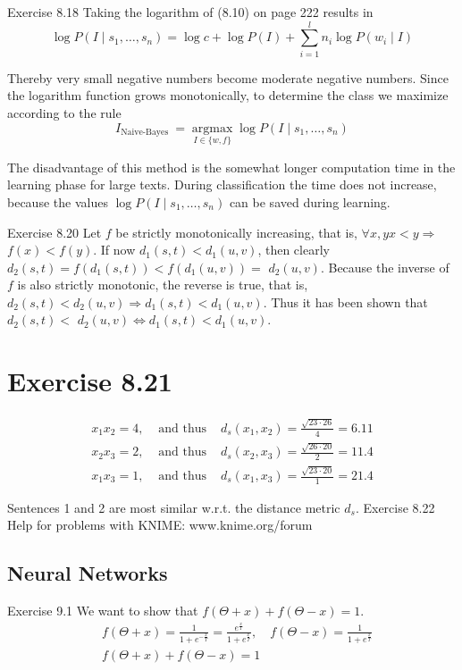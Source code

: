 \documentclass[10pt]{book}
\begin{document}
Exercise 8.18 Taking the logarithm of (8.10) on page 222 results in
$$
\log P\left(I \mid s_{1}, \ldots, s_{n}\right)=\log c+\log P(I)+\sum_{i=1}^{l} n_{i} \log P\left(w_{i} \mid I\right)
$$

Thereby very small negative numbers become moderate negative numbers. Since the logarithm function grows monotonically, to determine the class we maximize according to the rule
$$
I_{\text {Naive-Bayes }}=\underset{I \in\{w, f\}}{\operatorname{argmax}} \log P\left(I \mid s_{1}, \ldots, s_{n}\right)
$$

The disadvantage of this method is the somewhat longer computation time in the learning phase for large texts. During classification the time does not increase, because the values $\log P\left(I \mid s_{1}, \ldots, s_{n}\right)$ can be saved during learning.

Exercise 8.20 Let $f$ be strictly monotonically increasing, that is, $\forall x, y x<y \Rightarrow$ $f(x)<f(y)$. If now $d_{1}(s, t)<d_{1}(u, v)$, then clearly $d_{2}(s, t)=f\left(d_{1}(s, t)\right)<f\left(d_{1}(u, v)\right)=$ $d_{2}(u, v)$. Because the inverse of $f$ is also strictly monotonic, the reverse is true, that is, $d_{2}(s, t)<d_{2}(u, v) \Rightarrow d_{1}(s, t)<d_{1}(u, v)$. Thus it has been shown that $d_{2}(s, t)<$ $d_{2}(u, v) \Leftrightarrow d_{1}(s, t)<d_{1}(u, v)$.

\section{Exercise 8.21}
$$
\begin{array}{lll}
x_{1} x_{2}=4, & \text { and thus } & d_{s}\left(x_{1}, x_{2}\right)=\frac{\sqrt{23 \cdot 26}}{4}=6.11 \\
x_{2} x_{3}=2, & \text { and thus } & d_{s}\left(x_{2}, x_{3}\right)=\frac{\sqrt{26 \cdot 20}}{2}=11.4 \\
x_{1} x_{3}=1, & \text { and thus } & d_{s}\left(x_{1}, x_{3}\right)=\frac{\sqrt{23 \cdot 20}}{1}=21.4
\end{array}
$$

Sentences 1 and 2 are most similar w.r.t. the distance metric $d_{s}$.
Exercise 8.22 Help for problems with KNIME: www.knime.org/forum

\subsection{Neural Networks}

Exercise 9.1 We want to show that $f(\Theta+x)+f(\Theta-x)=1$.
$$
\begin{aligned}
& f(\Theta+x)=\frac{1}{1+e^{-\frac{x}{T}}}=\frac{e^{\frac{x}{T}}}{1+e^{\frac{x}{T}}}, \quad f(\Theta-x)=\frac{1}{1+e^{\frac{x}{T}}} \\
& f(\Theta+x)+f(\Theta-x)=1
\end{aligned}
$$
\end{document}
